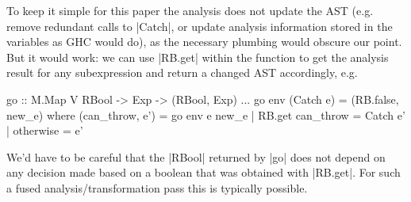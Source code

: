 \documentclass[manuscript,anonymous,screen,acmsmall]{acmart}
\begin{document}
To keep it simple for this paper the analysis does not update the AST (e.g. remove redundant calls to |Catch|, or update analysis information stored in the variables as GHC would do), as the necessary plumbing would obscure our point. But it would work: we can use |RB.get| within the function to get the analysis result for any subexpression and return a changed AST accordingly, e.g.
\restorecolumns
\begin{code}
    go :: M.Map V RBool -> Exp -> (RBool, Exp)
    ...
    go env (Catch e)        = (RB.false, new_e)
      where
        (can_throw, e') = go env e
        new_e  |  RB.get can_throw  = Catch e'
               |  otherwise         = e'
\end{code}
We'd have to be careful that the |RBool| returned by |go| does not depend on any decision made based on a boolean that was obtained with |RB.get|. For such a fused analysis/transformation pass this is typically possible.
\end{document}
